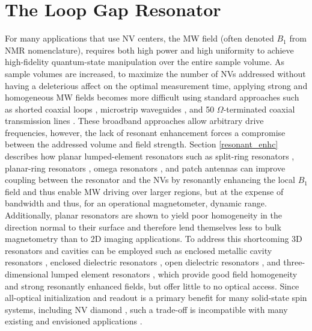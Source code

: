 
\chapter{The Loop Gap Resonator}

For many applications that use NV centers, the MW field (often denoted $B_1$ from NMR nomenclature), requires both high power and high uniformity to achieve high-fidelity quantum-state manipulation over the entire sample volume. As sample volumes are increased, to maximize the number of NVs addressed without having a deleterious affect on the optimal measurement time, applying strong and homogeneous MW fields becomes more difficult using standard approaches such as shorted coaxial loops \cite{clevenson2015broadband,chipaux2015magnetic}, microstrip waveguides \cite{andrich2017long,horowitz2012electron}, and 50 $\Omega$-terminated coaxial transmission lines \cite{li2010design,mrozek2015circularly,zhang2016microwave,zhang2018vector}. These broadband approaches allow arbitrary drive frequencies, however, the lack of resonant enhancement forces a compromise between the addressed volume and field strength. Section \ref{resonant_enhc} describes how planar lumped-element resonators such as split-ring resonators \cite{bayat2014efficient}, planar-ring resonators \cite{zhang2016microwave,sasaki2016broadband}, omega resonators \cite{twig2013ultra,horsley2018microwave,simpson2017electron}, and patch antennas \cite{zhang2016microwave} can improve coupling between the resonator and the NVs by resonantly enhancing the local $B_1$ field and thus enable MW driving over larger regions, but at the expense of bandwidth and thus, for an operational magnetometer, dynamic range. Additionally, planar resonators are shown to yield poor homogeneity in the direction normal to their surface and therefore lend themselves less to bulk magnetometry than to 2D imaging applications. To address this shortcoming 3D resonators and cavities can be employed such as enclosed metallic cavity resonators \cite{rose2017coherent}, enclosed dielectric resonators \cite{breeze2017continuous,floch2016towards,creedon2015strong}, open dielectric resonators \cite{kapitanova2017dielectric}, and three-dimensional lumped element resonators \cite{angerer2016collective}, which provide good field homogeneity and strong resonantly enhanced fields, but offer little to no optical access. Since all-optical initialization and readout is a primary benefit for many solid-state spin systems, including NV diamond \cite{doherty2013nitrogen}, such a trade-off is incompatible with many existing and envisioned applications \cite{schirhagl2014nitrogen}. 

